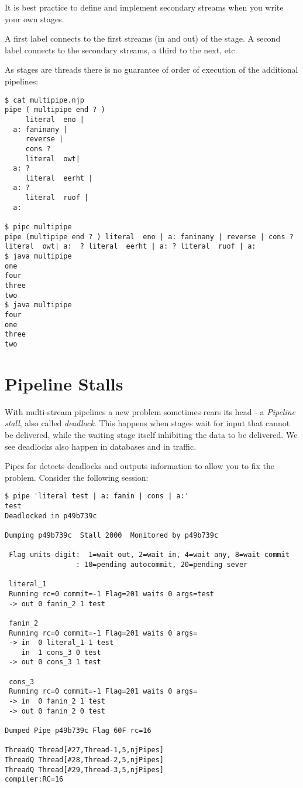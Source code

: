 It is best practice to define and implement secondary streams when you write your own stages.

A first label connects to the first streams (in and out) of the stage.
A second label connects to the secondary streams, a third to the next, etc.

As stages are threads there is no guarantee of order of execution of the additional pipelines:

\begin{lstlisting}
$ cat multipipe.njp
pipe ( multipipe end ? )
     literal  eno |
  a: faninany |
     reverse |
     cons ?
     literal  owt|
  a: ?
     literal  eerht |
  a: ?
     literal  ruof |
  a:

$ pipc multipipe
pipe (multipipe end ? ) literal  eno | a: faninany | reverse | cons ? literal  owt| a:  ? literal  eerht | a: ? literal  ruof | a:
$ java multipipe
one
four
three
two
$ java multipipe
four
one
three
two
\end{lstlisting}



\section{Pipeline Stalls} 
With multi-stream pipelines a new problem sometimes rears its head - a \emph{Pipeline stall},
also called \emph{deadlock}. This happens when stages
wait for input that cannot be delivered, while the waiting stage itself inhibiting the data to be delivered. We see deadlocks also happen in databases and in traffic.

Pipes for \nr{} detects deadlocks and outputs information to allow you to fix the problem.
Consider the following session:
\begin{lstlisting}
$ pipe 'literal test | a: fanin | cons | a:'
test
Deadlocked in p49b739c

Dumping p49b739c  Stall 2000  Monitored by p49b739c

 Flag units digit:  1=wait out, 2=wait in, 4=wait any, 8=wait commit
                 : 10=pending autocommit, 20=pending sever

 literal_1
 Running rc=0 commit=-1 Flag=201 waits 0 args=test
 -> out 0 fanin_2 1 test

 fanin_2
 Running rc=0 commit=-1 Flag=201 waits 0 args=
 -> in  0 literal_1 1 test
    in  1 cons_3 0 test
 -> out 0 cons_3 1 test

 cons_3
 Running rc=0 commit=-1 Flag=201 waits 0 args=
 -> in  0 fanin_2 1 test
 -> out 0 fanin_2 0 test

Dumped Pipe p49b739c Flag 60F rc=16

ThreadQ Thread[#27,Thread-1,5,njPipes]
ThreadQ Thread[#28,Thread-2,5,njPipes]
ThreadQ Thread[#29,Thread-3,5,njPipes]
compiler:RC=16
\end{lstlisting}

